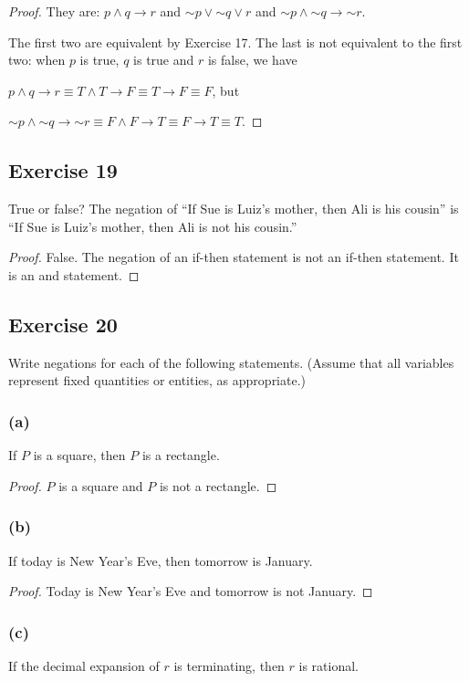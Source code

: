 \documentclass[14pt]{extarticle}
\begin{document}
\begin{proof}
They are: $p \wedge q \to r$ and ${\sim p} \vee {\sim q} \vee r$ and ${\sim p}
\wedge {\sim q} \to {\sim r}$.

The first two are equivalent by Exercise 17. The last is not equivalent to the
first two: when $p$ is true, $q$ is true and $r$ is false, we have

$p \wedge q \to r \equiv T \wedge T \to F \equiv T \to F \equiv F$, but 

${\sim p} \wedge {\sim q} \to {\sim r} \equiv F \wedge F \to T \equiv F \to T
\equiv T$.
\end{proof}

\subsection{Exercise 19}
True or false? The negation of “If Sue is Luiz’s mother, then Ali is his cousin”
is “If Sue is Luiz’s mother, then Ali is not his cousin.”

\begin{proof}
False. The negation of an if-then statement is not an if-then statement. It is
an and statement.
\end{proof}

\subsection{Exercise 20}
Write negations for each of the following statements. (Assume that all variables
represent fixed quantities or entities, as appropriate.)

\subsubsection{(a)}
If $P$ is a square, then $P$ is a rectangle.

\begin{proof}
$P$ is a square and $P$ is not a rectangle.
\end{proof}

\subsubsection{(b)}
If today is New Year’s Eve, then tomorrow is January.

\begin{proof}
Today is New Year’s Eve and tomorrow is not January.
\end{proof}

\subsubsection{(c)}
If the decimal expansion of $r$ is terminating, then $r$ is rational.
\end{document}
